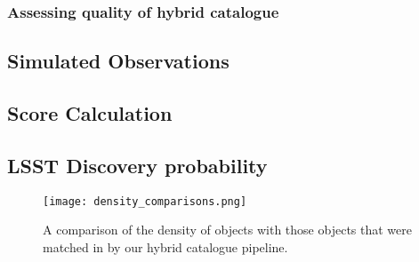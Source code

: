 \subsubsection{Assessing quality of hybrid catalogue}

\subsection{Simulated Observations}
\subsection{\dig{} Score Calculation}
\subsection{LSST Discovery probability}



\begin{figure}
    \centering
    \texttt{[image: density\_comparisons.png]}
    \caption{A comparison of the density of \mpco{} objects with those objects that were matched in \sss{} by our hybrid catalogue pipeline.}
\end{figure}